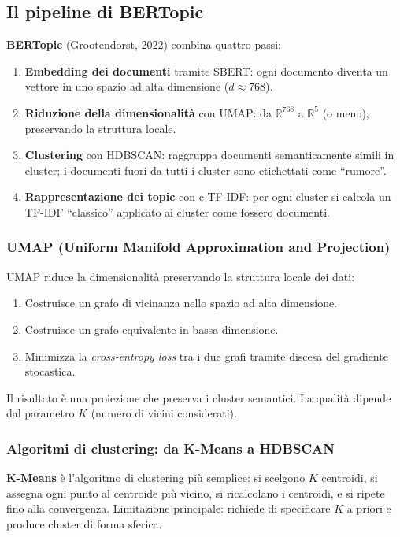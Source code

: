 \documentclass[12pt,a4paper]{article}
\begin{document}
\subsection{Il pipeline di BERTopic}

\textbf{BERTopic} (Grootendorst, 2022) combina quattro passi:

\begin{enumerate}
  \item \textbf{Embedding dei documenti} tramite SBERT: ogni documento diventa un vettore
        in uno spazio ad alta dimensione ($d \approx 768$).
  \item \textbf{Riduzione della dimensionalità} con UMAP: da $\mathbb{R}^{768}$ a
        $\mathbb{R}^5$ (o meno), preservando la struttura locale.
  \item \textbf{Clustering} con HDBSCAN: raggruppa documenti semanticamente simili
        in cluster; i documenti fuori da tutti i cluster sono etichettati come ``rumore''.
  \item \textbf{Rappresentazione dei topic} con c-TF-IDF: per ogni cluster si calcola
        un TF-IDF ``classico'' applicato ai cluster come fossero documenti.
\end{enumerate}

\subsubsection{UMAP (Uniform Manifold Approximation and Projection)}

UMAP riduce la dimensionalità preservando la struttura locale dei dati:
\begin{enumerate}
  \item Costruisce un grafo di vicinanza nello spazio ad alta dimensione.
  \item Costruisce un grafo equivalente in bassa dimensione.
  \item Minimizza la \textit{cross-entropy loss} tra i due grafi tramite
        discesa del gradiente stocastica.
\end{enumerate}
Il risultato è una proiezione che preserva i cluster semantici. La qualità dipende dal
parametro $K$ (numero di vicini considerati).

\subsubsection{Algoritmi di clustering: da K-Means a HDBSCAN}

\textbf{K-Means} è l'algoritmo di clustering più semplice: si scelgono $K$ centroidi,
si assegna ogni punto al centroide più vicino, si ricalcolano i centroidi, e si ripete fino
alla convergenza. Limitazione principale: richiede di specificare $K$ a priori e produce
cluster di forma sferica.
\end{document}

